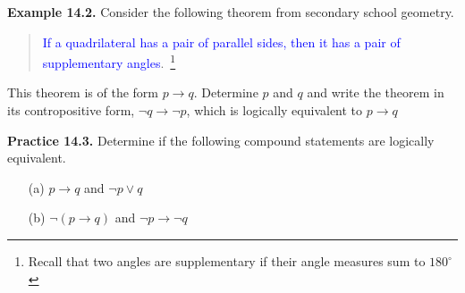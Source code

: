 \documentclass[aspectratio=169]{beamer}
\providecommand{\Blue}[1]{\textcolor{blue}{#1}}
\begin{document}
\begin{frame}[plain]{}

{\bf Example 14.2.} Consider the following theorem from secondary school geometry.
  \begin{quote}
     \Blue{ If a quadrilateral has a pair of parallel sides, then it has a pair of 
      supplementary angles}.~\footnote{Recall that two angles are supplementary if their angle measures sum to
      $180^\circ$}
   \end{quote}
    This theorem is of the form $p\rightarrow q$. Determine $p$ and $q$ and write the theorem 
    in its contropositive form, $\neg q\rightarrow \neg p$, which is logically equivalent to $p\rightarrow q$
 \medskip
 \pause
 
 {\bf Practice 14.3.}
 Determine if the following compound statements are logically
     equivalent.
     \begin{itemize}
       \item[(a)] $p\rightarrow q$ and $\neg p \vee q$
       \item[(b)] $\neg (p\rightarrow q)$ and $\neg p \rightarrow \neg q$
     \end{itemize}
\end{frame}
\end{document}
